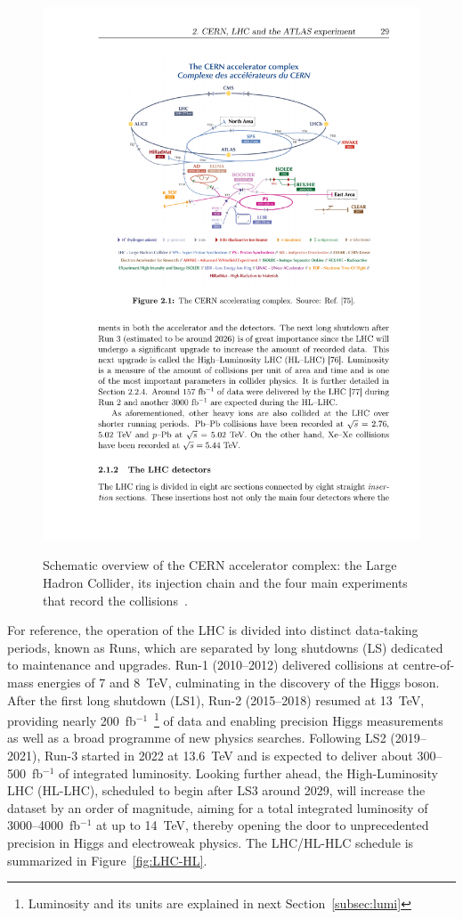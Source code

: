 \begin{figure}[htbp]
    \centering
    \includegraphics[width=1\linewidth]{images/CCC-v2022}\\
    \caption{Schematic overview of the CERN accelerator complex: the Large Hadron Collider, its injection chain and the four main experiments that record the collisions~\cite{Lopienska:2800984}.}
    \label{LHC:chain}
\end{figure}

For reference, the operation of the LHC is divided into distinct data-taking periods, known as Runs, which are separated by long shutdowns (LS) dedicated to maintenance and upgrades. Run-1 (2010--2012) delivered collisions at centre-of-mass energies of 7 and 8~TeV, culminating in the discovery of the Higgs boson. After the first long shutdown (LS1), Run-2 (2015--2018) resumed at 13~TeV, providing nearly 200~fb$^{-1}$~\footnote{Luminosity and its units are explained in next Section~\ref{subsec:lumi}} of data and enabling precision Higgs measurements as well as a broad programme of new physics searches. Following LS2 (2019--2021), Run-3 started in 2022 at 13.6~TeV and is expected to deliver about 300--500~fb$^{-1}$ of integrated luminosity. Looking further ahead, the High-Luminosity LHC (HL-LHC), scheduled to begin after LS3 around 2029, will increase the dataset by an order of magnitude, aiming for a total integrated luminosity of 3000--4000~fb$^{-1}$ at up to 14~TeV, thereby opening the door to unprecedented precision in Higgs and electroweak physics. The LHC/HL-HLC schedule is summarized in Figure~\ref{fig:LHC-HL}.

